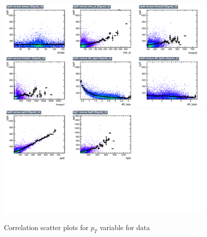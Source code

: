 \begin{figure}[!htb]%
\centering
\includegraphics[width=0.95\textwidth]{figures/CRDY/dataset/plots/correlationscatter_hpt0__Id_c1.pdf}
\includegraphics[width=0.95\textwidth]{figures/CRDY/dataset/plots/correlationscatter_hpt0__Id_c2.pdf}
\caption{ Correlation scatter plots for \HZZ $p_{T}$  variable for data}%
\label{fig:correlations_CRDY_hpt0_S}                                                       
\end{figure}



